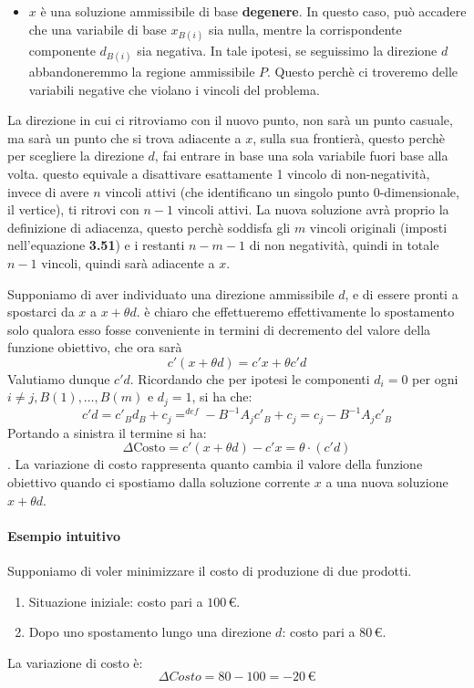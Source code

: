 \begin{itemize}
per cui per $\theta$ sufficientemente piccolo, la non negatività è preservata e $d$ è una direzione ammissibile.
\item[(b)] $x$ è una soluzione ammissibile di base \textbf{degenere}. In questo caso, può accadere che una variabile di base $x_{B(i)}$ sia nulla, mentre la corrispondente componente $d_{B(i)}$ sia negativa. In tale ipotesi, se seguissimo la direzione $d$ abbandoneremmo la regione ammissibile $P$.
Questo perchè ci troveremo delle variabili negative che violano i vincoli del problema.
\end{itemize}


\begin{center}
    La direzione in cui ci ritroviamo con il nuovo punto, non sarà un punto casuale, ma sarà un punto che si trova adiacente a $x$, sulla sua frontierà, questo perchè per scegliere la direzione $d$, fai entrare in base una sola variabile fuori base alla volta.
    questo equivale a disattivare esattamente 1 vincolo di non-negatività, invece di avere $n$ vincoli attivi (che identificano un singolo punto $0$-dimensionale, il vertice), ti ritrovi con $n - 1$ vincoli attivi.
    La nuova soluzione avrà proprio la definizione di adiacenza, questo perchè soddisfa gli $m$ vincoli originali (imposti nell'equazione \textbf{3.51}) e i restanti $n-m-1$ di non negatività, quindi in totale $n-1$ vincoli, quindi sarà adiacente a $x$.
\end{center}


Supponiamo di aver individuato una direzione ammissibile $d$, e di essere pronti a spostarci da $x$ a $x + \theta d$.
è chiaro che effettueremo effettivamente lo spostamento solo qualora esso fosse conveniente in termini di decremento del valore della funzione obiettivo, che ora sarà
\begin{equation}
c'(x + \theta d) = c'x + \theta c' d
\end{equation}
Valutiamo dunque $c'd$. Ricordando che per ipotesi le componenti $d_i = 0$ per ogni $i \neq j,B(1),\dots,B(m)$ e $d_j = 1$, si ha che:
\begin{equation}
    c'd = c'_B d_B + c_j =^{def} -B^{-1} A_j c'_B + c_j = c_j -B^{-1} A_j c'_B
\end{equation}
Portando a sinistra il termine si ha:
$$\Delta \text{Costo} = c'(x + \theta d) - c'x = \theta \cdot (c'd)$$.
La variazione di costo rappresenta quanto cambia il valore della funzione obiettivo quando ci spostiamo dalla soluzione corrente \(x\) a una nuova soluzione \(x+\theta d\).
\paragraph{Esempio intuitivo}
Supponiamo di voler minimizzare il costo di produzione di due prodotti.
\begin{enumerate}
    \item Situazione iniziale: costo pari a \(100\,€\).
    \item Dopo uno spostamento lungo una direzione \(d\): costo pari a \(80\,€\).
\end{enumerate}
La variazione di costo è:
\[
\Delta Costo=80-100=-20\,€
\]

